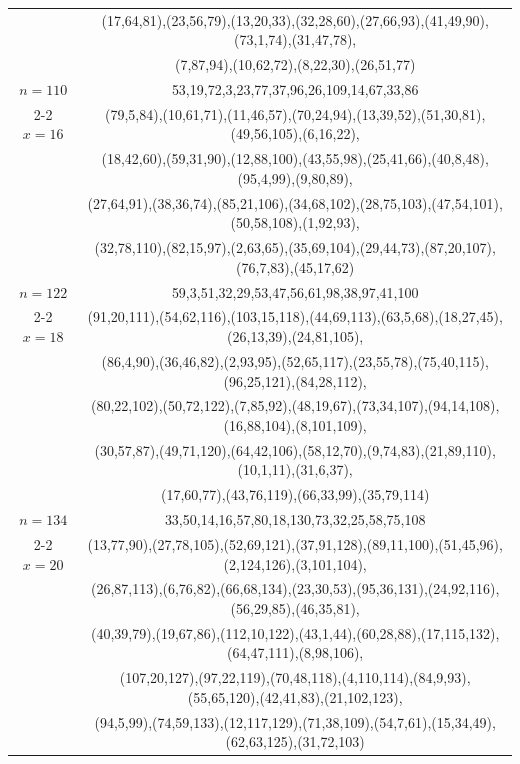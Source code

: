 \begin{tabular}{| c | c |}
&(17,64,81),(23,56,79),(13,20,33),(32,28,60),(27,66,93),(41,49,90),(73,1,74),(31,47,78),\\
&(7,87,94),(10,62,72),(8,22,30),(26,51,77)\\
\hline 
\(n=110\) & 
53,19,72,3,23,77,37,96,26,109,14,67,33,86\\
\cline{2-2}
\(x=16\)
&(79,5,84),(10,61,71),(11,46,57),(70,24,94),(13,39,52),(51,30,81),(49,56,105),(6,16,22),\\
&(18,42,60),(59,31,90),(12,88,100),(43,55,98),(25,41,66),(40,8,48),(95,4,99),(9,80,89),\\
&(27,64,91),(38,36,74),(85,21,106),(34,68,102),(28,75,103),(47,54,101),(50,58,108),(1,92,93),\\
&(32,78,110),(82,15,97),(2,63,65),(35,69,104),(29,44,73),(87,20,107),(76,7,83),(45,17,62)\\
\hline 
\(n=122\) & 
59,3,51,32,29,53,47,56,61,98,38,97,41,100\\
\cline{2-2}
\(x=18\)
&(91,20,111),(54,62,116),(103,15,118),(44,69,113),(63,5,68),(18,27,45),(26,13,39),(24,81,105),\\
&(86,4,90),(36,46,82),(2,93,95),(52,65,117),(23,55,78),(75,40,115),(96,25,121),(84,28,112),\\
&(80,22,102),(50,72,122),(7,85,92),(48,19,67),(73,34,107),(94,14,108),(16,88,104),(8,101,109),\\
&(30,57,87),(49,71,120),(64,42,106),(58,12,70),(9,74,83),(21,89,110),(10,1,11),(31,6,37),\\
&(17,60,77),(43,76,119),(66,33,99),(35,79,114)\\
\hline 
\(n=134\) & 
33,50,14,16,57,80,18,130,73,32,25,58,75,108\\
\cline{2-2}
\(x=20\)
&(13,77,90),(27,78,105),(52,69,121),(37,91,128),(89,11,100),(51,45,96),(2,124,126),(3,101,104),\\
&(26,87,113),(6,76,82),(66,68,134),(23,30,53),(95,36,131),(24,92,116),(56,29,85),(46,35,81),\\
&(40,39,79),(19,67,86),(112,10,122),(43,1,44),(60,28,88),(17,115,132),(64,47,111),(8,98,106),\\
&(107,20,127),(97,22,119),(70,48,118),(4,110,114),(84,9,93),(55,65,120),(42,41,83),(21,102,123),\\
&(94,5,99),(74,59,133),(12,117,129),(71,38,109),(54,7,61),(15,34,49),(62,63,125),(31,72,103)\\
\hline 
\end{tabular}